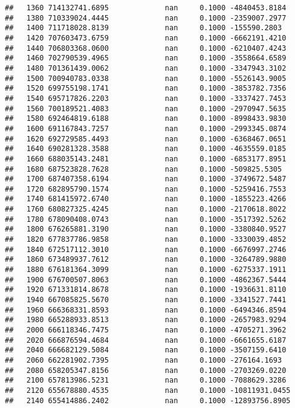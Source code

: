 \documentclass[
]{article}
\begin{document}
\begin{verbatim}
##   1360 714132741.6895             nan     0.1000 -4840453.8184
##   1380 710339024.4445             nan     0.1000 -2359007.2977
##   1400 711718028.8139             nan     0.1000 -155590.2803
##   1420 707603473.6759             nan     0.1000 -6662191.4210
##   1440 706803368.0600             nan     0.1000 -6210407.4243
##   1460 702790539.4965             nan     0.1000 -3558664.6589
##   1480 701361439.0062             nan     0.1000 -3347943.3102
##   1500 700940783.0338             nan     0.1000 -5526143.9005
##   1520 699755198.1741             nan     0.1000 -3853782.7356
##   1540 695717826.2203             nan     0.1000 -3337427.7453
##   1560 700189521.4083             nan     0.1000 -2970947.5635
##   1580 692464819.6188             nan     0.1000 -8998433.9830
##   1600 691167843.7257             nan     0.1000 -2993345.0874
##   1620 692729585.4493             nan     0.1000 -6368467.0651
##   1640 690281328.3588             nan     0.1000 -4635559.0185
##   1660 688035143.2481             nan     0.1000 -6853177.8951
##   1680 687523828.7628             nan     0.1000 -509825.5305
##   1700 687407358.6194             nan     0.1000 -3749672.5487
##   1720 682895790.1574             nan     0.1000 -5259416.7553
##   1740 681415972.6740             nan     0.1000 -1855223.4266
##   1760 680827325.4245             nan     0.1000 -2170618.8022
##   1780 678090408.0743             nan     0.1000 -3517392.5262
##   1800 676265881.3190             nan     0.1000 -3380840.9527
##   1820 677837786.9858             nan     0.1000 -3330039.4852
##   1840 672517112.3010             nan     0.1000 -6676997.2746
##   1860 673489937.7612             nan     0.1000 -3264789.9880
##   1880 676181364.3099             nan     0.1000 -6275337.1911
##   1900 676700507.8063             nan     0.1000 -4862367.5444
##   1920 671331814.8678             nan     0.1000 -1936631.8110
##   1940 667085825.5670             nan     0.1000 -3341527.7441
##   1960 666368331.8593             nan     0.1000 -6494346.8594
##   1980 665288933.8513             nan     0.1000 -2657983.9294
##   2000 666118346.7475             nan     0.1000 -4705271.3962
##   2020 666876594.4684             nan     0.1000 -6661655.6187
##   2040 666682129.5084             nan     0.1000 -3507159.6410
##   2060 662281902.7395             nan     0.1000 -276164.1693
##   2080 658205347.8156             nan     0.1000 -2703269.0220
##   2100 657813986.5231             nan     0.1000 -7088629.3286
##   2120 655678880.4535             nan     0.1000 -10811931.0455
##   2140 655414886.2402             nan     0.1000 -12893756.8905

\end{verbatim}
\end{document}
